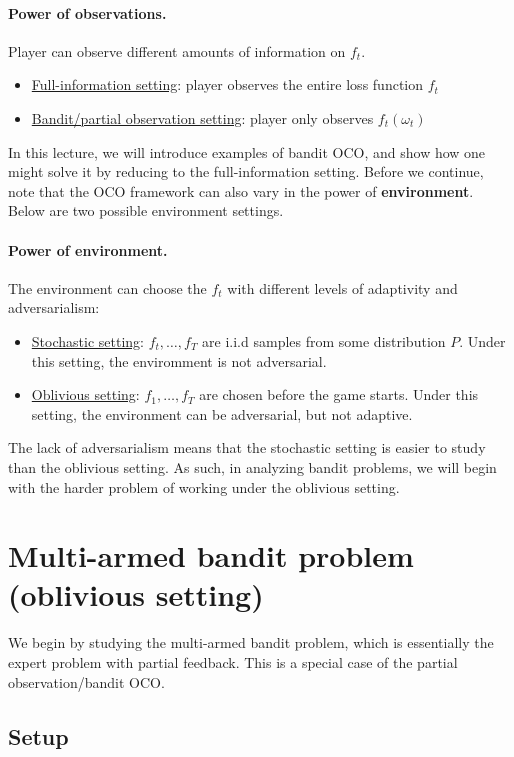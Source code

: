\documentclass[11pt]{article}
\begin{document}
\paragraph{Power of observations.} Player can observe different amounts of information on $f_t$.
\begin{itemize}
    \item \underline{Full-information setting}: player observes the entire loss function $f_t$
    \item \underline{Bandit/partial observation setting}: player only observes $f_t(\omega_t)$
\end{itemize}
In this lecture, we will introduce examples of bandit OCO, and show how one might solve it by reducing to the full-information setting. Before we continue, note that the OCO framework can also vary in the power of \textbf{environment}. Below are two possible environment settings.

\paragraph{Power of environment.} The environment can choose the $f_t$ with different levels of adaptivity and adversarialism:
\begin{itemize}
    \item \underline{Stochastic setting}: $f_t, \dots, f_T$ are i.i.d samples from some distribution $P$. Under this setting, the enviromment is not adversarial.
    \item \underline{Oblivious setting}: $f_1, \dots, f_T$ are chosen before the game starts. Under this setting, the environment can be adversarial, but not adaptive. 
\end{itemize}
The lack of adversarialism means that the stochastic setting is easier to study than the oblivious setting. As such, in analyzing bandit problems, we will begin with the harder problem of working under the oblivious setting. 


\section{Multi-armed bandit problem (oblivious setting)}

We begin by studying the multi-armed bandit problem, which is essentially the expert problem with partial feedback. This is a special case of the partial observation/bandit OCO. 

\subsection{Setup}
\end{document}
